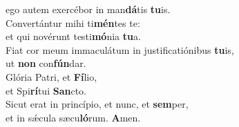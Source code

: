 \evenverse ego autem exercébor in man\textbf{dá}tis \textbf{tu}is.\\
\oddverse Convertántur mihi ti\textbf{mén}tes te:~\*\\
\oddverse et qui novérunt testi\textbf{mó}nia \textbf{tu}a.\\
\evenverse Fiat cor meum immaculátum in justificatiónibus \textbf{tu}is,~\*\\
\evenverse ut \textbf{non} con\textbf{fún}dar.\\
\oddverse Glória Patri, et \textbf{Fí}lio,~\*\\
\oddverse et Spi\textbf{rí}tui \textbf{San}cto.\\
\evenverse Sicut erat in princípio, et nunc, et \textbf{sem}per,~\*\\
\evenverse et in sǽcula sæcu\textbf{ló}rum. \textbf{A}men.\\
